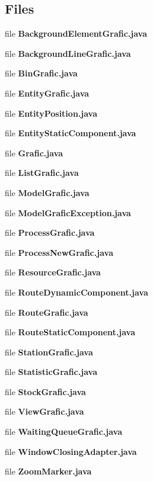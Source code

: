 \subsection*{Files}
\begin{DoxyCompactItemize}
\item 
file {\bfseries Background\-Element\-Grafic.\-java}
\item 
file {\bfseries Background\-Line\-Grafic.\-java}
\item 
file {\bfseries Bin\-Grafic.\-java}
\item 
file {\bfseries Entity\-Grafic.\-java}
\item 
file {\bfseries Entity\-Position.\-java}
\item 
file {\bfseries Entity\-Static\-Component.\-java}
\item 
file {\bfseries Grafic.\-java}
\item 
file {\bfseries List\-Grafic.\-java}
\item 
file {\bfseries Model\-Grafic.\-java}
\item 
file {\bfseries Model\-Grafic\-Exception.\-java}
\item 
file {\bfseries Process\-Grafic.\-java}
\item 
file {\bfseries Process\-New\-Grafic.\-java}
\item 
file {\bfseries Resource\-Grafic.\-java}
\item 
file {\bfseries Route\-Dynamic\-Component.\-java}
\item 
file {\bfseries Route\-Grafic.\-java}
\item 
file {\bfseries Route\-Static\-Component.\-java}
\item 
file {\bfseries Station\-Grafic.\-java}
\item 
file {\bfseries Statistic\-Grafic.\-java}
\item 
file {\bfseries Stock\-Grafic.\-java}
\item 
file {\bfseries View\-Grafic.\-java}
\item 
file {\bfseries Waiting\-Queue\-Grafic.\-java}
\item 
file {\bfseries Window\-Closing\-Adapter.\-java}
\item 
file {\bfseries Zoom\-Marker.\-java}
\end{DoxyCompactItemize}

